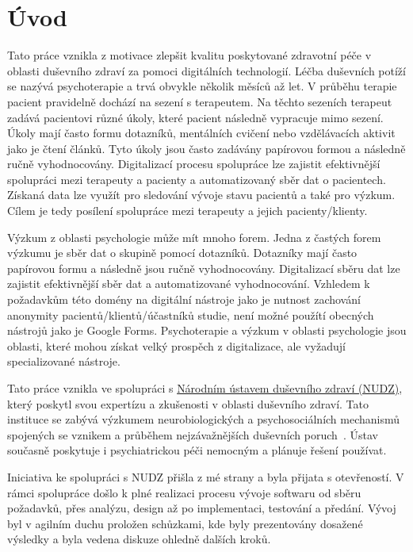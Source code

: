 \chapter*{Úvod}

Tato práce vznikla z motivace zlepšit kvalitu poskytované zdravotní péče v oblasti duševního zdraví za pomoci digitálních technologií.
Léčba duševních potíží se nazývá psychoterapie a trvá obvykle několik měsíců až let.
V průběhu terapie pacient pravidelně dochází na sezení s terapeutem.
Na těchto sezeních terapeut zadává pacientovi různé úkoly, které pacient následně vypracuje mimo sezení.
Úkoly mají často formu dotazníků, mentálních cvičení nebo vzdělávacích aktivit jako je čtení článků.
Tyto úkoly jsou často zadávány papírovou formou a následně ručně vyhodnocovány.
Digitalizací procesu spolupráce lze zajistit efektivnější spolupráci mezi terapeuty a pacienty a automatizovaný sběr dat o pacientech.
Získaná data lze využít pro sledování vývoje stavu pacientů a také pro výzkum.
Cílem je tedy posílení spolupráce mezi terapeuty a jejich pacienty/klienty.

Výzkum z oblasti psychologie může mít mnoho forem.
Jedna z častých forem výzkumu je sběr dat o skupině pomocí dotazníků.
Dotazníky mají často papírovou formu a následně jsou ručně vyhodnocovány.
Digitalizací sběru dat lze zajistit efektivnější sběr dat a automatizované vyhodnocování.
Vzhledem k požadavkům této domény na digitální nástroje jako je nutnost zachování anonymity pacientů/klientů/účastníků studie, není možné použítí obecných nástrojů jako je Google Forms.
Psychoterapie a výzkum v oblasti psychologie jsou oblasti, které mohou získat velký prospěch z digitalizace, ale vyžadují specializované nástroje.

Tato práce vznikla ve spolupráci s \href{https://www.nudz.cz/}{Národním ústavem duševního zdraví (NUDZ)}, který poskytl svou expertízu a zkušenosti v oblasti duševního zdraví.
Tato instituce se zabývá výzkumem neurobiologických a psychosociálních mechanismů spojených se vznikem a průběhem nejzávažnějších duševních poruch~\cite{nudz-profil}.
Ústav současně poskytuje i psychiatrickou péči nemocným a plánuje řešení používat.

Iniciativa ke spolupráci s NUDZ přišla z mé strany a byla přijata s otevřeností.
V rámci spolupráce došlo k plné realizaci procesu vývoje softwaru od sběru požadavků, přes analýzu, design až po implementaci, testování a předání.
Vývoj byl v agilním duchu proložen schůzkami, kde byly prezentovány dosažené výsledky a byla vedena diskuze ohledně dalších kroků.


